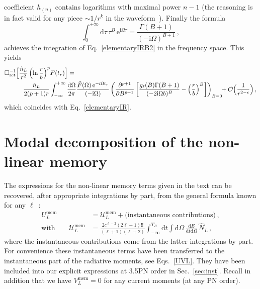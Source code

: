 \documentclass[prd,preprint,superscriptaddress,tightenlines,nofootinbib,
  eqsecnum,showpacs]{revtex4}
\newcommand{\ud}{\mathrm{d}}
\newcommand{\ui}{\mathrm{i}}
\begin{document}
coefficient $h_{(n)}$ contains logarithms with maximal power $n-1$
(the reasoning is in fact valid for any piece $\sim 1/r^k$ in the
waveform~\cite{BD86}). Finally the formula~\cite{GR}
%
\begin{equation}
\int_0^{+\infty}\ud \tau\,\tau^B\,\mathrm{e}^{\ui \Omega \tau} =
\frac{\Gamma(B+1)}{(-\ui \Omega)^{B+1}}\,,
\end{equation}
%
achieves the integration of Eq.~\eqref{elementaryIRB2} in the
frequency space. This yields
%
\begin{align} \label{intfourier}
 &\Box^{-1}_\mathrm{ret} \Bigl[ \frac{\hat{n}_L}{r^2}
   \left(\ln\frac{r}{b}\right)^p \!F(t_r)\Bigr] = \nonumber\\ 
 &\qquad\quad \frac{\hat{n}_L}{2(p+1)r}
 \int_{-\infty}^{+\infty}\frac{\ud\Omega}{2\pi}
 \frac{\tilde{F}(\Omega)\,\mathrm{e}^{-\ui \Omega
     t_r}}{(-\ui\Omega)}\left(\frac{\partial^{p+1} }{\partial
   B^{p+1}}\left[\frac{g_\ell(B)\Gamma(B+1)}{(-2\ui \Omega b)^B} -
   \left(\frac{r}{b}\right)^B \right]\right)_{B=0} \!\!+
 \mathcal{O}\Big( \frac{1}{r^{2-\epsilon}}\Big) \,,
\end{align}
%
which coincides with Eq.~\eqref{elementaryIR}.

\section{Modal decomposition of the non-linear memory}
\label{app:memory_modes}

The expressions for the non-linear memory terms given in the text can
be recovered, after appropriate integrations by part, from the general
formula known for any $\ell$~\cite{F09, F11}:
%
\begin{subequations}\label{eq:memgen}\begin{align} 
U_{L}^\text{mem} &= \mathcal{U}_{L}^\text{mem} + \text{(instantaneous
  contributions)} \,, \\ \text{with}\qquad \mathcal{U}_{L}^\text{mem}
&= \frac{2 c^{\ell-2} (2\ell +1)!!}{(\ell+1)(\ell+2)}
\int_{-\infty}^{T_R} \ud t \int \ud \Omega \,\frac{\ud E}{\ud t\ud
  \Omega} \,\hat{N}_{L} \,,
\end{align}
\end{subequations}
%
where the instantaneous contributions come from the latter
integrations by part. For convenience these instantaneous terms have
been transferred to the instantaneous part of the radiative moments,
see Eqs.~\eqref{UVL}. They have been included into our explicit
expressions at 3.5PN order in Sec.~\ref{sec:inst}. Recall in addition
that we have $V_{L}^\text{mem} = 0$ for any current moments (at any PN
order).
\end{document}
